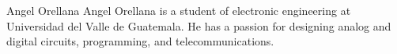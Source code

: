 \begin{IEEEbiography}{Angel Orellana}
Angel Orellana is a student of electronic engineering at Universidad del Valle 
de Guatemala. He has a passion for designing analog and digital circuits, 
programming, and telecommunications.
\end{IEEEbiography}
    
